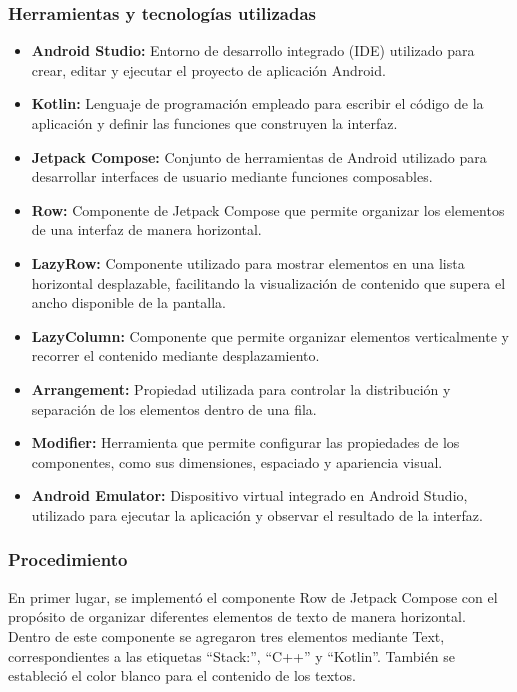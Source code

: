 \documentclass[12pt,a4paper]{article}
\begin{document}
\subsubsection{Herramientas y tecnologías utilizadas}
\begin{itemize}
	
	\item \textbf{Android Studio:} Entorno de desarrollo integrado (IDE) utilizado para crear, editar y ejecutar el proyecto de aplicación Android.
	
	\item \textbf{Kotlin:} Lenguaje de programación empleado para escribir el código de la aplicación y definir las funciones que construyen la interfaz.
	
	\item \textbf{Jetpack Compose:} Conjunto de herramientas de Android utilizado para desarrollar interfaces de usuario mediante funciones composables.
	
	\item \textbf{Row:} Componente de Jetpack Compose que permite organizar los elementos de una interfaz de manera horizontal.
	
	\item \textbf{LazyRow:} Componente utilizado para mostrar elementos en una lista horizontal desplazable, facilitando la visualización de contenido que supera el ancho disponible de la pantalla.
	
	\item \textbf{LazyColumn:} Componente que permite organizar elementos verticalmente y recorrer el contenido mediante desplazamiento.
	
	\item \textbf{Arrangement:} Propiedad utilizada para controlar la distribución y separación de los elementos dentro de una fila.
	
	\item \textbf{Modifier:} Herramienta que permite configurar las propiedades de los componentes, como sus dimensiones, espaciado y apariencia visual.
	
	\item \textbf{Android Emulator:} Dispositivo virtual integrado en Android Studio, utilizado para ejecutar la aplicación y observar el resultado de la interfaz.
	
\end{itemize}
\subsubsection{Procedimiento}
En primer lugar, se implementó el componente Row de
Jetpack Compose con el propósito de organizar
diferentes elementos de texto de manera horizontal.
Dentro de este componente se agregaron tres elementos
mediante Text, correspondientes a las etiquetas
``Stack:'', ``C++'' y ``Kotlin''. También se estableció
el color blanco para el contenido de los textos.
\end{document}
